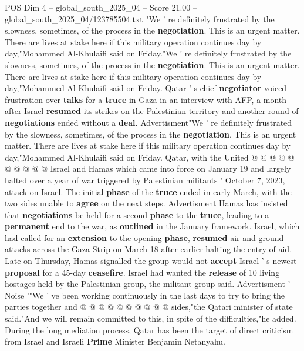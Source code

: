 \begin{textsample}{POS Dim 4 – global\_south\_2025\_04 – Score 21.00 – global\_south\_2025\_04/123785504.txt}  \label{ex:f4_pos_245}
"We ' re definitely frustrated by the slowness, sometimes, of the process in the \textbf{negotiation}.
This is an urgent matter.
There are lives at stake here if this military operation continues day by day,"Mohammed Al-Khulaifi said on Friday."We ' re definitely frustrated by the slowness, sometimes, of the process in the \textbf{negotiation}.
This is an urgent matter.
There are lives at stake here if this military operation continues day by day,"Mohammed Al-Khulaifi said on Friday.
Qatar ' s chief \textbf{negotiator} voiced frustration over \textbf{talks} for a \textbf{truce} in Gaza in an interview with AFP, a month after Israel \textbf{resumed} its strikes on the Palestinian territory and another round of \textbf{negotiations} ended without a \textbf{deal}.
Advertisment"We ' re definitely frustrated by the slowness, sometimes, of the process in the \textbf{negotiation}.
This is an urgent matter.
There are lives at stake here if this military operation continues day by day,"Mohammed Al-Khulaifi said on Friday.
Qatar, with the United @ @ @ @ @ @ @ @ @ @ Israel and Hamas which came into force on January 19 and largely halted over a year of war triggered by Palestinian militants ' October 7, 2023, attack on Israel.
The initial \textbf{phase} of the \textbf{truce} ended in early March, with the two sides unable to \textbf{agree} on the next steps.
Advertisment Hamas has insisted that \textbf{negotiations} be held for a second \textbf{phase} to the \textbf{truce}, leading to a \textbf{permanent} end to the war, as \textbf{outlined} in the January framework.
Israel, which had called for an \textbf{extension} to the opening \textbf{phase}, \textbf{resumed} air and ground attacks across the Gaza Strip on March 18 after earlier halting the entry of aid.
Late on Thursday, Hamas signalled the group would not \textbf{accept} Israel ' s newest \textbf{proposal} for a 45-day \textbf{ceasefire}.
Israel had wanted the \textbf{release} of 10 living hostages held by the Palestinian group, the militant group said.
Advertisment ' Noise '"We ' ve been working continuously in the last days to try to bring the parties together and @ @ @ @ @ @ @ @ @ @ sides,"the Qatari minister of state said."And we will remain committed to this, in spite of the difficulties,"he added.
During the long mediation process, Qatar has been the target of direct criticism from Israel and Israeli \textbf{Prime} Minister Benjamin Netanyahu.

\end{textsample}
